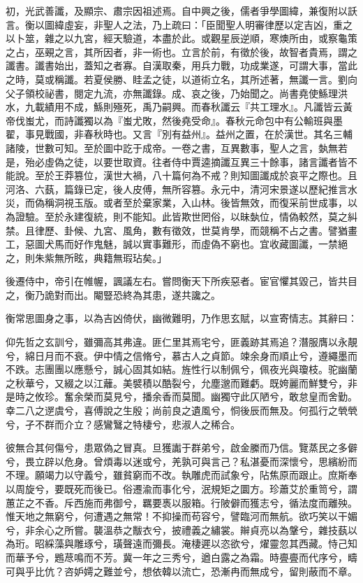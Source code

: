 \begin{pinyinscope}
初，光武善讖，及顯宗、肅宗因祖述焉。自中興之後，儒者爭學圖緯，兼復附以訞言。衡以圖緯虛妄，非聖人之法，乃上疏曰：「臣聞聖人明審律歷以定吉凶，重之以卜筮，雜之以九宮，經天驗道，本盡於此。或觀星辰逆順，寒燠所由，或察龜策之占，巫覡之言，其所因者，非一術也。立言於前，有徵於後，故智者貴焉，謂之讖書。讖書始出，蓋知之者寡。自漢取秦，用兵力戰，功成業遂，可謂大事，當此之時，莫或稱讖。若夏侯勝、眭孟之徒，以道術立名，其所述著，無讖一言。劉向父子領校祕書，閱定九流，亦無讖錄。成、哀之後，乃始聞之。尚書堯使鯀理洪水，九載績用不成，鯀則殛死，禹乃嗣興。而春秋讖云『共工理水』。凡讖皆云黃帝伐蚩尤，而詩讖獨以為『蚩尤敗，然後堯受命』。春秋元命包中有公輸班與墨翟，事見戰國，非春秋時也。又言『別有益州』。益州之置，在於漢世。其名三輔諸陵，世數可知。至於圖中訖于成帝。一卷之書，互異數事，聖人之言，埶無若是，殆必虛偽之徒，以要世取資。往者侍中賈逵摘讖互異三十餘事，諸言讖者皆不能說。至於王莽篡位，漢世大禍，八十篇何為不戒？則知圖讖成於哀平之際也。且河洛、六蓺，篇錄已定，後人皮傅，無所容篡。永元中，清河宋景遂以歷紀推言水災，而偽稱洞視玉版。或者至於棄家業，入山林。後皆無效，而復采前世成事，以為證驗。至於永建復統，則不能知。此皆欺世罔俗，以昧埶位，情偽較然，莫之糾禁。且律歷、卦候、九宮、風角，數有徵效，世莫肯學，而競稱不占之書。譬猶畫工，惡圖犬馬而好作鬼魅，誠以實事難形，而虛偽不窮也。宜收藏圖讖，一禁絕之，則朱紫無所眩，典籍無瑕玷矣。」

後遷侍中，帝引在帷幄，諷議左右。嘗問衡天下所疾惡者。宦官懼其毀己，皆共目之，衡乃詭對而出。閹豎恐終為其患，遂共讒之。

衡常思圖身之事，以為吉凶倚伏，幽微難明，乃作思玄賦，以宣寄情志。其辭曰：

仰先哲之玄訓兮，雖彌高其弗違。匪仁里其焉宅兮，匪義跡其焉追？潛服膺以永靚兮，綿日月而不衰。伊中情之信脩兮，慕古人之貞節。竦余身而順止兮，遵繩墨而不跌。志團團以應懸兮，誠心固其如結。旌性行以制佩兮，佩夜光與瓊枝。驼幽蘭之秋華兮，又綴之以江蘺。美襞積以酷裂兮，允塵邈而難虧。既姱麗而鮮雙兮，非是時之攸珍。奮余榮而莫見兮，播余香而莫聞。幽獨守此仄陋兮，敢怠皇而舍勤。幸二八之遻虞兮，喜傅說之生殷；尚前良之遺風兮，恫後辰而無及。何孤行之煢煢兮，孑不群而介立？感鸞鷖之特棲兮，悲淑人之稀合。

彼無合其何傷兮，患眾偽之冒真。旦獲讟于群弟兮，啟金縢而乃信。覽蒸民之多僻兮，畏立辟以危身。曾煩毒以迷或兮，羌孰可與言己？私湛憂而深懷兮，思繽紛而不理。願竭力以守義兮，雖貧窮而不改。執雕虎而試象兮，阽焦原而跟止。庶斯奉以周旋兮，要既死而後已。俗遷渝而事化兮，泯規矩之圜方。珍蕭艾於重笥兮，謂蕙芷之不香。斥西施而弗御兮，羈要褭以服箱。行陂僻而獲志兮，循法度而離殃。惟天地之無窮兮，何遭遇之無常！不抑操而苟容兮，譬臨河而無航。欲巧笑以干媚兮，非余心之所嘗。襲溫恭之黻衣兮，披禮義之繡裳。辮貞亮以為鞶兮，雜技蓺以為珩。昭綵藻與雕琢兮，璜聲遠而彌長。淹棲遲以恣欲兮，燿靈忽其西藏。恃己知而華予兮，鶗荩鳴而不芳。冀一年之三秀兮，遒白露之為霜。時亹亹而代序兮，疇可與乎比伉？咨妒嫮之難並兮，想依韓以流亡，恐漸冉而無成兮，留則蔽而不章。


\end{pinyinscope}
